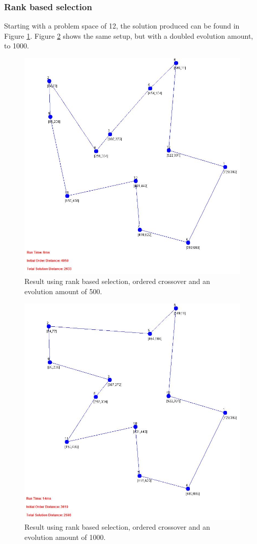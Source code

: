 \documentclass[article]{IEEEtran}
\begin{document}
\subsubsection{Rank based selection}
Starting with a problem space of 12, the solution produced can be found in Figure \ref{fig:8}. Figure \ref{fig:9} shows the same setup, but with a doubled evolution amount, to 1000.
\begin{figure}[H]
\centering
\includegraphics[width=.9\linewidth]{images/ordered_rank_015_500_false}
\caption{Result using rank based selection, ordered crossover and an evolution amount of 500.}
\label{fig:8}
\end{figure}

\begin{figure}[H]
\centering
\includegraphics[width=.9\linewidth]{images/ordered_rank_015_1000_false}
\caption{Result using rank based selection, ordered crossover and an evolution amount of 1000.}
\label{fig:9}
\end{figure}
\end{document}
